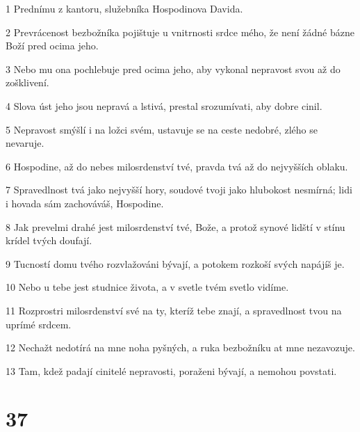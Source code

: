 \par 1 Prednímu z kantoru, služebníka Hospodinova Davida.
\par 2 Prevrácenost bezbožníka pojištuje u vnitrnosti srdce mého, že není žádné bázne Boží pred ocima jeho.
\par 3 Nebo mu ona pochlebuje pred ocima jeho, aby vykonal nepravost svou až do zošklivení.
\par 4 Slova úst jeho jsou nepravá a lstivá, prestal srozumívati, aby dobre cinil.
\par 5 Nepravost smýšlí i na ložci svém, ustavuje se na ceste nedobré, zlého se nevaruje.
\par 6 Hospodine, až do nebes milosrdenství tvé, pravda tvá až do nejvyšších oblaku.
\par 7 Spravedlnost tvá jako nejvyšší hory, soudové tvoji jako hlubokost nesmírná; lidi i hovada sám zachováváš, Hospodine.
\par 8 Jak prevelmi drahé jest milosrdenství tvé, Bože, a protož synové lidští v stínu krídel tvých doufají.
\par 9 Tucností domu tvého rozvlažováni bývají, a potokem rozkoší svých napájíš je.
\par 10 Nebo u tebe jest studnice života, a v svetle tvém svetlo vidíme.
\par 11 Rozprostri milosrdenství své na ty, kteríž tebe znají, a spravedlnost tvou na uprímé srdcem.
\par 12 Nechažt nedotírá na mne noha pyšných, a ruka bezbožníku at mne nezavozuje.
\par 13 Tam, kdež padají cinitelé nepravosti, poraženi bývají, a nemohou povstati.

\chapter{37}


